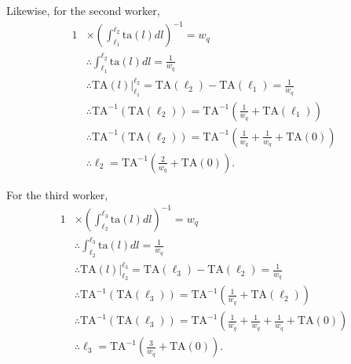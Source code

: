 \documentclass[hidelinks, nonatbib]{elsarticle}
\begin{document}
\begin{enumerate}
Likewise, for the second worker,
\begin{align}
    1 
    &\times 
    \left(
        \int_{\ell_1}^{\ell_2}
        \text{ta}(l)
        dl
    \right) ^ {-1}
    =
    w_q
    \\
    &\therefore
    \int_{\ell_1}^{\ell_2}
    \text{ta}(l)
    dl
    =
    \frac{1}{w_q}
    \\
    &\therefore
    \text{TA}(l)
    \big|_{\ell_1}^{\ell_2}
    =
    \text{TA}(\ell_2)
    -
    \text{TA}(\ell_1)
    =
    \frac{1}{w_q}
    \\
    &\therefore
    \text{TA}^{-1}(
        \text{TA}(\ell_2)
    )
    =
    \text{TA}^{-1}\left(
        \frac{1}{w_q}
        +
        \text{TA}(\ell_1)
    \right)
    \\
    &\therefore
    \text{TA}^{-1}(
        \text{TA}(\ell_2)
    )
    =
    \text{TA}^{-1}\left(
        \frac{1}{w_q}
        +
        \frac{1}{w_q}
        +
        \text{TA}(0)
    \right)
    \\
    &\therefore
    \ell_2
    =
    \text{TA}^{-1}\left(
        \frac{2}{w_q}
        +
        \text{TA}(0)
    \right)
    .
\end{align}

For the third worker,
\begin{align}
    1 
    &\times 
    \left(
        \int_{\ell_2}^{\ell_3}
        \text{ta}(l)
        dl
    \right) ^ {-1}
    =
    w_q
    \\
    &\therefore
    \int_{\ell_2}^{\ell_3}
    \text{ta}(l)
    dl
    =
    \frac{1}{w_q}
    \\
    &\therefore
    \text{TA}(l)
    \big|_{\ell_2}^{\ell_3}
    =
    \text{TA}(\ell_3)
    -
    \text{TA}(\ell_2)
    =
    \frac{1}{w_q}
    \\
    &\therefore
    \text{TA}^{-1}(
        \text{TA}(\ell_3)
    )
    =
    \text{TA}^{-1}\left(
        \frac{1}{w_q}
        +
        \text{TA}(\ell_2)
    \right)
    \\
    &\therefore
    \text{TA}^{-1}(
        \text{TA}(\ell_3)
    )
    =
    \text{TA}^{-1}\left(
        \frac{1}{w_q}
        +
        \frac{1}{w_q}
        +
        \frac{1}{w_q}
        +
        \text{TA}(0)
    \right)
    \\
    &\therefore
    \ell_3
    =
    \text{TA}^{-1}\left(
        \frac{3}{w_q}
        +
        \text{TA}(0)
    \right)
    .
\end{align}


\end{enumerate}
\end{document}
